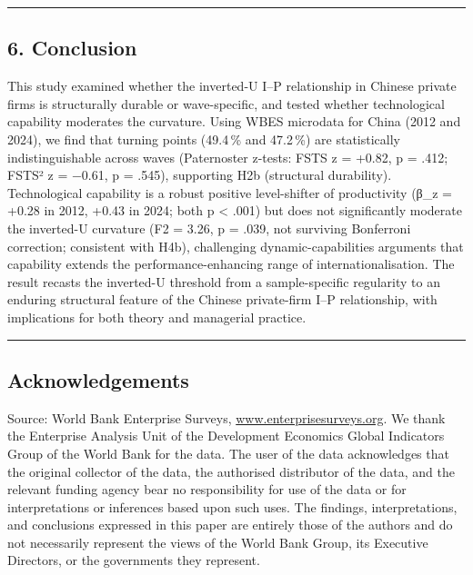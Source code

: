 \documentclass[12pt,a4paper]{article}
\begin{document}
\begin{center}\rule{0.5\linewidth}{0.5pt}\end{center}

\hypertarget{6-conclusion}{%
\subsection{6. Conclusion}\label{6-conclusion}}

This study examined whether the inverted-U I--P relationship in Chinese
private firms is structurally durable or wave-specific, and tested
whether technological capability moderates the curvature. Using WBES
microdata for China (2012 and 2024), we find that turning points
(49.4\,\% and 47.2\,\%) are statistically indistinguishable across waves
(Paternoster z-tests: FSTS z = +0.82, p = .412; FSTS² z = −0.61, p =
.545), supporting H2b (structural durability). Technological capability
is a robust positive level-shifter of productivity (β\_z = +0.28 in
2012, +0.43 in 2024; both p \textless{} .001) but does not significantly
moderate the inverted-U curvature (F2 = 3.26, p = .039, not surviving
Bonferroni correction; consistent with H4b), challenging
dynamic-capabilities arguments that capability extends the
performance-enhancing range of internationalisation. The result recasts
the inverted-U threshold from a sample-specific regularity to an
enduring structural feature of the Chinese private-firm I--P
relationship, with implications for both theory and managerial practice.

\begin{center}\rule{0.5\linewidth}{0.5pt}\end{center}

\hypertarget{acknowledgements}{%
\subsection{Acknowledgements}\label{acknowledgements}}

Source: World Bank Enterprise Surveys,
\href{http://www.enterprisesurveys.org}{www.enterprisesurveys.org}. We
thank the Enterprise Analysis Unit of the Development Economics Global
Indicators Group of the World Bank for the data. The user of the data
acknowledges that the original collector of the data, the authorised
distributor of the data, and the relevant funding agency bear no
responsibility for use of the data or for interpretations or inferences
based upon such uses. The findings, interpretations, and conclusions
expressed in this paper are entirely those of the authors and do not
necessarily represent the views of the World Bank Group, its Executive
Directors, or the governments they represent.
\end{document}
